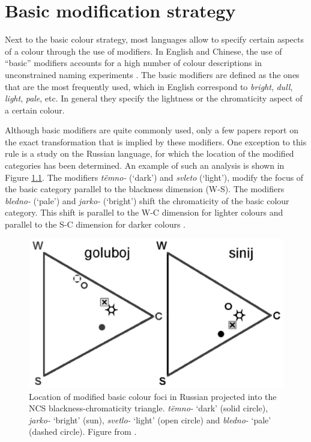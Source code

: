\chapter{Basic modification strategy}
\label{s:basic-modification-strategy}
\label{s:last-strategy}

Next to the basic colour strategy, most languages allow to
specify certain aspects of a colour through the use of modifiers. In
English and Chinese, the use of ``basic'' modifiers accounts for a high
number of colour descriptions in unconstrained naming experiments
\citep{simpson91sex, lin01unconstrained}. The basic modifiers are
defined as the ones that are the most frequently used, which in
English correspond to \textit{bright}, \textit{dull}, \textit{light}, \textit{pale},
etc. In general they specify the lightness or the chromaticity aspect
of a certain colour.

Although basic modifiers are quite commonly used, only a few
papers report on the exact transformation that is implied by these
modifiers. One exception to this rule is a study on the Russian
language, for which the location of the modified categories has been
determined. An example of such an analysis is shown in Figure
\ref{f:ams-russian-diagram}. The modifiers \textit{t\"emno-} (`dark') and
\textit{svleto} (`light'), modify the focus of the basic category parallel to the blackness dimension (W-S). The modifiers \textit{bledno-} (`pale') and \textit{jarko-} (`bright') shift the chromaticity of the basic colour
category. This shift is parallel to the W-C dimension for lighter
colours and parallel to the S-C dimension for darker colours
\citep{safuanova07russian}.

\begin{figure}[htpb]
  \centering
  \includegraphics[width=.5\textwidth]{./achromatic/figures/russian-diagram.pdf}
  \caption[Location of modified basic colour foci in Russian]{Location
    of modified basic colour foci in Russian projected into the NCS
    blackness-chromaticity triangle. \textit{t\"emno-} `dark' (solid
    circle), \textit{jarko-} `bright' (sun), \textit{svetlo-} `light'
    (open circle) and \textit{bledno-} `pale' (dashed circle). Figure
    from \cite{paramei05singing}.}
  \label{f:ams-russian-diagram}
\end{figure}


